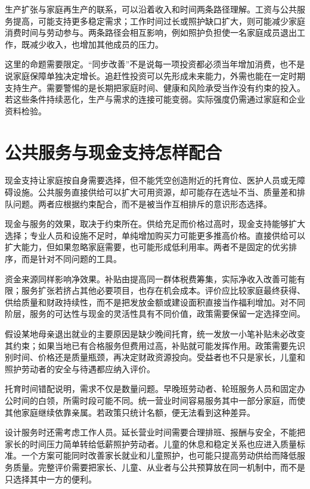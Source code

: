 \documentclass[UTF8,fontset=fandol,zihao=-4,oneside,openany]{ctexbook}
\begin{document}
\label{arg:P152}
生产扩张与家庭再生产的联系，可以沿着收入和时间两条路径理解。工资与公共服务提高，可能支持更多稳定需求；工作时间过长或照护缺口扩大，则可能减少家庭消费时间与劳动参与。两条路径会相互影响，例如照护负担使一名家庭成员退出工作，既减少收入，也增加其他成员的压力。

这里的命题需要限定。“同步改善”不是说每一项投资都必须当年增加消费，也不是说家庭保障单独决定增长。追赶性投资可以先形成未来能力，外需也能在一定时期支持生产。需要警惕的是长期把家庭时间、健康和风险承受当作没有约束的投入。若这些条件持续恶化，生产与需求的连接可能变弱。实际强度仍需通过家庭和企业资料检验。

\section{公共服务与现金支持怎样配合}
现金支持让家庭按自身需要选择，但不能凭空创造附近的托育位、医护人员或无障碍设施。公共服务直接供给可以扩大可用资源，却可能存在选址不当、质量差和排队问题。两者应根据约束配合，而不是被当作互相排斥的意识形态选择。

\label{arg:P153}
现金与服务的效果，取决于约束所在。供给充足而价格过高时，现金支持能够扩大选择；专业人员和设施不足时，单纯增加购买力可能更多推高价格。直接供给可以扩大能力，但如果忽略家庭需要，也可能形成低利用率。两者不是固定的优劣排序，而是针对不同问题的工具。

资金来源同样影响净效果。补贴由提高同一群体税费筹集，实际净收入改善可能有限；服务扩张若挤占其他必要项目，也存在机会成本。评价应比较家庭最终获得、供给质量和财政持续性，而不是把发放金额或建设面积直接当作福利增加。对不同阶层，服务的可达性与现金的灵活性具有不同价值，政策需要保留一定选择空间。

假设某地母亲退出就业的主要原因是缺少晚间托育，统一发放一小笔补贴未必改变其约束；如果当地已有合格服务但费用过高，补贴就可能发挥作用。政策需要先识别时间、价格还是质量瓶颈，再决定财政资源投向。受益者也不只是家长，儿童和照护劳动者的安全与待遇都应纳入评价。

\label{arg:P154}
托育时间错配说明，需求不仅是数量问题。早晚班劳动者、轮班服务人员和固定办公时间的白领，所需时段可能不同。统一营业时间容易服务其中一部分家庭，而使其他家庭继续依靠亲属。若政策只统计名额，便无法看到这种差异。

设计服务时还需考虑工作人员。延长营业时间需要合理排班、报酬与安全，不能把家长的时间压力简单转给低薪照护劳动者。儿童的休息和稳定关系也应进入质量标准。一个方案可能同时改善家长就业和儿童照护，也可能只提高劳动供给而降低服务质量。完整评价需要把家长、儿童、从业者与公共预算放在同一机制中，而不是只选择其中一方的便利。
\end{document}
